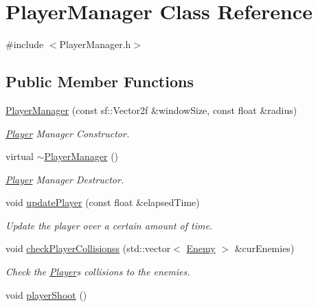 \hypertarget{class_player_manager}{}\section{Player\+Manager Class Reference}
\label{class_player_manager}


{\ttfamily \#include $<$Player\+Manager.\+h$>$}

\subsection*{Public Member Functions}
\begin{DoxyCompactItemize}
\item 
\hyperlink{class_player_manager_aa2ce60af19b9d80bd884e2edaea726d6}{Player\+Manager} (const sf\+::\+Vector2f \&window\+Size, const float \&radius)
\begin{DoxyCompactList}\small\item\em \hyperlink{class_player}{Player} Manager Constructor. \end{DoxyCompactList}\item 
\mbox{\label{class_player_manager_ab53de6b16914b7591fc2bd3038069ac7}} 
virtual \hyperlink{class_player_manager_ab53de6b16914b7591fc2bd3038069ac7}{$\sim$\+Player\+Manager} ()
\begin{DoxyCompactList}\small\item\em \hyperlink{class_player}{Player} Manager Destructor. \end{DoxyCompactList}\item 
void \hyperlink{class_player_manager_a171946405d72c219802315721e09467d}{update\+Player} (const float \&elapsed\+Time)
\begin{DoxyCompactList}\small\item\em Update the player over a certain amount of time. \end{DoxyCompactList}\item 
void \hyperlink{class_player_manager_ac4bad97c7d281a47a876d7cee5f864bd}{check\+Player\+Collisionss} (std\+::vector$<$ \hyperlink{class_enemy}{Enemy} $>$ \&cur\+Enemies)
\begin{DoxyCompactList}\small\item\em Check the \hyperlink{class_player}{Player}\textquotesingle{}s collisions to the enemies. \end{DoxyCompactList}\item 
void \hyperlink{class_player_manager_a7a61c6484a3dd12293d2481c5f61fb71}{player\+Shoot} ()

\end{DoxyCompactItemize}
